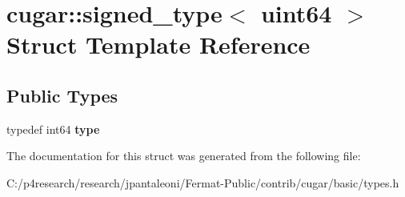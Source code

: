 \hypertarget{structcugar_1_1signed__type_3_01uint64_01_4}{}\section{cugar\+:\+:signed\+\_\+type$<$ uint64 $>$ Struct Template Reference}
\label{structcugar_1_1signed__type_3_01uint64_01_4}
\subsection*{Public Types}
\begin{DoxyCompactItemize}
\item 
\mbox{\label{structcugar_1_1signed__type_3_01uint64_01_4_abc205d20b3da25b4a6c9173d5500977c}} 
typedef int64 {\bfseries type}
\end{DoxyCompactItemize}


The documentation for this struct was generated from the following file\+:\begin{DoxyCompactItemize}
\item 
C\+:/p4research/research/jpantaleoni/\+Fermat-\/\+Public/contrib/cugar/basic/types.\+h\end{DoxyCompactItemize}
